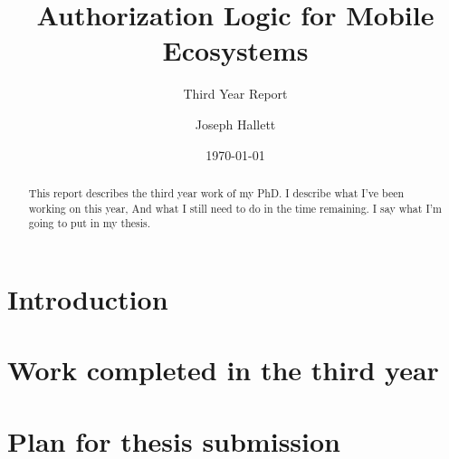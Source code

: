 \documentclass[a4paper]{scrartcl}
\title{Authorization Logic for Mobile Ecosystems}
\subtitle{Third Year Report}
\author{Joseph Hallett}
\date\today
\begin{document}
\maketitle

\begin{abstract}
  This report describes the third year work of my PhD.
  I describe what I've been working on this year,
  And what I still need to do in the time remaining.
  I say what I'm going to put in my thesis.
\end{abstract}

\section{Introduction}
\label{sec:introduction}

\section{Work completed in the third year}
\label{sec:work}

\section{Plan for thesis submission}
\label{sec:thesis}
 
\end{document}
